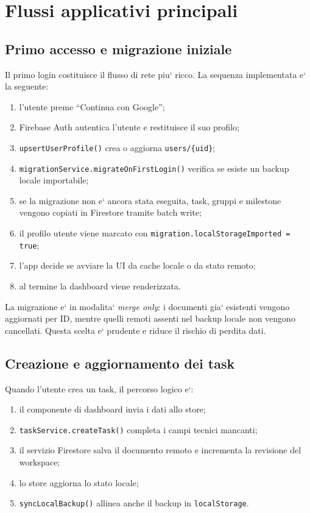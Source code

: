 \documentclass[11pt,a4paper]{article}
\begin{document}
\section{Flussi applicativi principali}

\subsection{Primo accesso e migrazione iniziale}

Il primo login costituisce il flusso di rete piu` ricco. La sequenza implementata e` la seguente:

\begin{enumerate}
  \item l'utente preme ``Continua con Google'';
  \item Firebase Auth autentica l'utente e restituisce il suo profilo;
  \item \texttt{upsertUserProfile()} crea o aggiorna \texttt{users/\{uid\}};
  \item \texttt{migrationService.migrateOnFirstLogin()} verifica se esiste un backup locale importabile;
  \item se la migrazione non e` ancora stata eseguita, task, gruppi e milestone vengono copiati in Firestore tramite batch write;
  \item il profilo utente viene marcato con \texttt{migration.localStorageImported = true};
  \item l'app decide se avviare la UI da cache locale o da stato remoto;
  \item al termine la dashboard viene renderizzata.
\end{enumerate}

La migrazione e` in modalita` \emph{merge only}: i documenti gia` esistenti vengono aggiornati per ID, mentre quelli remoti assenti nel backup locale non vengono cancellati. Questa scelta e` prudente e riduce il rischio di perdita dati.

\subsection{Creazione e aggiornamento dei task}

Quando l'utente crea un task, il percorso logico e`:

\begin{enumerate}
  \item il componente di dashboard invia i dati allo store;
  \item \texttt{taskService.createTask()} completa i campi tecnici mancanti;
  \item il servizio Firestore salva il documento remoto e incrementa la revisione del workspace;
  \item lo store aggiorna lo stato locale;
  \item \texttt{syncLocalBackup()} allinea anche il backup in \texttt{localStorage}.
\end{enumerate}
\end{document}
